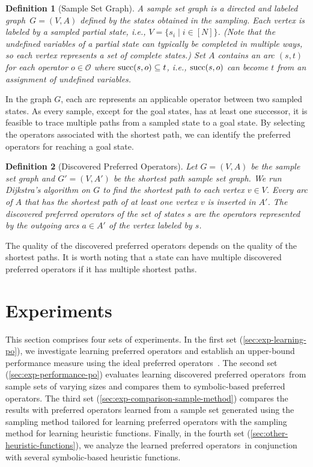 \documentclass[ppgc,diss,english]{iiufrgs}
\newtheorem{definition}{Definition}
\begin{document}
\begin{definition}[Sample Set Graph]\label{def:graph}
A sample set graph is a directed and labeled graph~$G = (V, A)$ defined by the states obtained in the sampling. Each vertex is labeled by a sampled partial state, i.e., $V = \{s_i \mid i \in [N]\}$. (Note that the undefined variables of a partial state can typically be completed in multiple ways, so each vertex represents a set of complete states.) Set $A$ contains an arc $(s,t)$ for each operator $o \in \mathcal{O}$ where $\operatorname{succ}(s,o) \subseteq t$, i.e., $\operatorname{succ}(s,o)$ can become $t$ from an assignment of undefined variables.
\end{definition}

In the graph $G$, each arc represents an applicable operator between two sampled states. As every sample, except for the goal states, has at least one successor, it is feasible to trace multiple paths from a sampled state to a goal state. By selecting the operators associated with the shortest path, we can identify the preferred operators for reaching a goal state.

\begin{definition}[Discovered Preferred Operators]\label{def:discovered_preferred_operators}
Let $G = (V, A)$ be the sample set graph and $G' = (V, A')$ be the shortest path sample set graph. We run Dijkstra's algorithm on $G$ to find the shortest path to each vertex $v \in V$. Every arc of $A$ that has the shortest path of at least one vertex $v$ is inserted in $A'$. The discovered preferred operators of the set of states $s$ are the operators represented by the outgoing arcs $a \in A'$ of the vertex labeled by $s$.
\end{definition}

The quality of the discovered preferred operators depends on the quality of the shortest paths. It is worth noting that a state can have multiple discovered preferred operators if it has multiple shortest paths.


%
%
\chapter{Experiments}
\label{cha:exp-experiments}
This section comprises four sets of experiments. In the first set (\cref{sec:exp-learning-po}), we investigate learning preferred operators and establish an upper-bound performance measure using the ideal preferred operators~\postar. The second set (\cref{sec:exp-performance-po}) evaluates learning discovered preferred operators~\pog from sample sets of varying sizes and compares them to symbolic-based preferred operators. The third set (\cref{sec:exp-comparison-sample-method}) compares the results with preferred operators learned from a sample set generated using the sampling method tailored for learning preferred operators with the sampling method for learning heuristic functions. Finally, in the fourth set (\cref{sec:other-heuristic-functions}), we analyze the learned preferred operators~\pog in conjunction with several symbolic-based heuristic functions.
\end{document}
